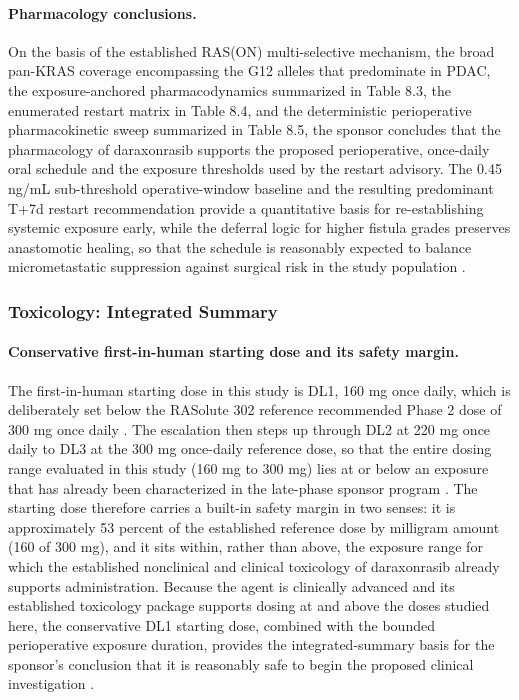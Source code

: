 \paragraph{Pharmacology conclusions.}
On the basis of the established RAS(ON) multi-selective mechanism, the broad
pan-KRAS coverage encompassing the G12 alleles that predominate in PDAC, the
exposure-anchored pharmacodynamics summarized in Table 8.3, the enumerated restart
matrix in Table 8.4, and the deterministic perioperative pharmacokinetic sweep
summarized in Table 8.5, the sponsor concludes that the pharmacology of
daraxonrasib supports the proposed perioperative, once-daily oral schedule and the
exposure thresholds used by the restart advisory. The 0.45 ng/mL sub-threshold
operative-window baseline and the resulting predominant T+7d restart recommendation
provide a quantitative basis for re-establishing systemic exposure early, while the
deferral logic for higher fistula grades preserves anastomotic healing, so that the
schedule is reasonably expected to balance micrometastatic suppression against
surgical risk in the study population \cite{onpremwhippl,qspmetpancre}.

\subsubsection{Toxicology: Integrated Summary}

\paragraph{Conservative first-in-human starting dose and its safety margin.}
The first-in-human starting dose in this study is DL1, 160 mg once daily, which
is deliberately set below the RASolute 302 reference recommended Phase 2 dose of
300 mg once daily \cite{daraxwhipple}. The escalation then steps up through DL2
at 220 mg once daily to DL3 at the 300 mg once-daily reference dose, so that the
entire dosing range evaluated in this study (160 mg to 300 mg) lies at or below
an exposure that has already been characterized in the late-phase sponsor
program \cite{daraxwhipple,onpremwhippl}. The starting dose therefore carries a
built-in safety margin in two senses: it is approximately 53 percent of the
established reference dose by milligram amount (160 of 300 mg), and it sits
within, rather than above, the exposure range for which the established
nonclinical and clinical toxicology of daraxonrasib already supports
administration. Because the agent is clinically advanced and its established
toxicology package supports dosing at and above the doses studied here, the
conservative DL1 starting dose, combined with the bounded perioperative exposure
duration, provides the integrated-summary basis for the sponsor's conclusion that
it is reasonably safe to begin the proposed clinical investigation
\cite{phase1guidance,daraxwhipple}.

